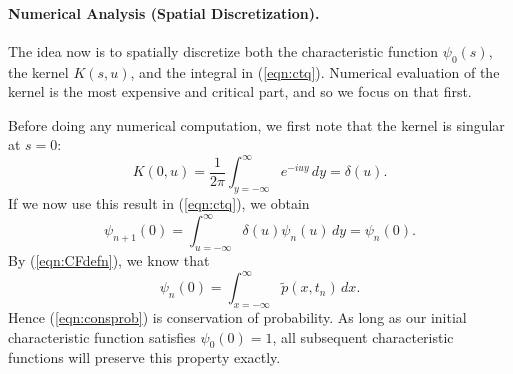 \documentclass[11pt,letterpaper]{article}
\begin{document}
\paragraph{Numerical Analysis (Spatial Discretization).} The idea now is to spatially discretize both the characteristic function $\psi_0(s)$, the kernel $K(s,u)$, and the integral in (\ref{eqn:ctq}).   Numerical evaluation of the kernel is the most expensive and critical part, and so we focus on that first.

Before doing any numerical computation, we first note that the kernel is singular at $s=0$:
\begin{equation}
\label{eqn:s0}
K(0,u) = \frac{1}{2 \pi} \int_{y=-\infty}^\infty e^{-i u y} \, dy = \delta(u).
\end{equation}
If we now use this result in (\ref{eqn:ctq}), we obtain
\begin{equation}
\label{eqn:consprob}
\psi_{n+1}(0) = \int_{u=-\infty}^\infty \delta(u) \psi_n(u) \, dy = \psi_n(0).
\end{equation}
By (\ref{eqn:CFdefn}), we know that
\[
\psi_n(0) = \int_{x=-\infty}^\infty \widetilde{p}(x,t_n) \, dx.
\]
Hence (\ref{eqn:consprob}) is conservation of probability.  As long as our initial characteristic function satisfies $\psi_0(0) = 1$, all subsequent characteristic functions will preserve this property exactly.
\end{document}

